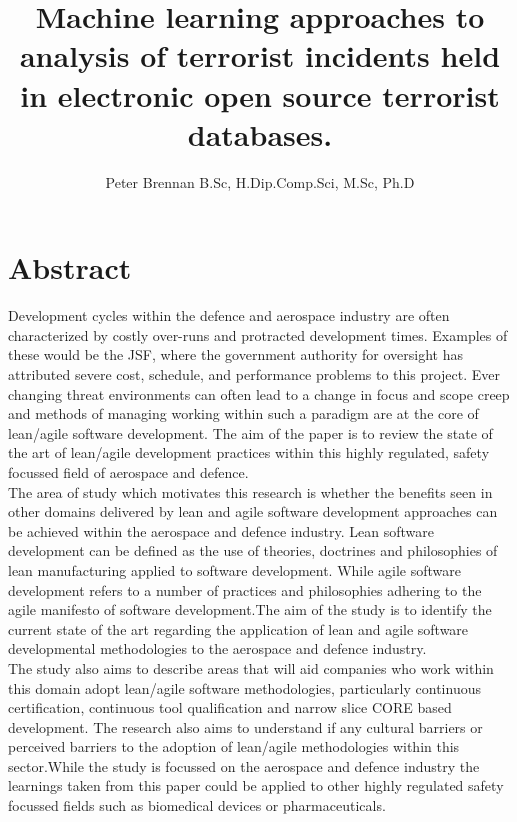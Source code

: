 \documentclass[11pt,twocolumn]{article}
\title{Machine learning approaches to analysis of terrorist incidents held in electronic open source terrorist databases.}
\author{Peter Brennan B.Sc, H.Dip.Comp.Sci, M.Sc, Ph.D}
\begin{document}
\maketitle
\section*{\textbf{Abstract}} 
Development cycles within the defence and aerospace industry are often characterized by costly over-runs and protracted development times. Examples of these would be the JSF, where the government authority for oversight has attributed severe cost, schedule, and performance problems to this project. Ever changing threat environments can often lead to a change in focus and scope creep and methods of managing working within such a paradigm are at the core of lean/agile software development. 
The aim of the paper is to review the state of the art of lean/agile development practices within this highly regulated, safety focussed field of aerospace and defence. 
\\
The area of study which motivates this research is whether the benefits seen in other domains delivered by lean and agile software development approaches can be achieved  within the aerospace and defence industry. Lean software development can be defined as the use of theories, doctrines and philosophies of lean manufacturing applied to software development. While agile software development refers to a number of practices and philosophies  adhering to the agile manifesto of software development.The aim of the study is to identify the current state of the art regarding the application of lean  and agile software developmental methodologies to the aerospace and defence industry. 
\\
The study also aims to describe areas that will aid companies who work within this domain adopt lean/agile software methodologies, particularly continuous certification, continuous tool qualification and narrow slice CORE based development. The research also aims to understand if any cultural barriers or perceived barriers to the adoption of lean/agile methodologies within this sector.While the study is focussed on the aerospace and defence industry the learnings taken from this paper could be applied to other highly regulated safety focussed fields such as biomedical devices or pharmaceuticals.
\end{document}
